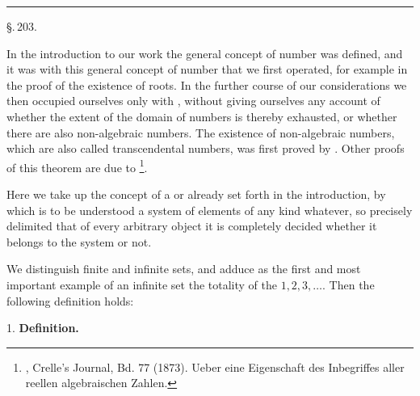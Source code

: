 
\begin{center}

\end{center}

\begin{center}
\rule{4cm}{0.4pt}
\end{center}

\begin{center}
\S.\,203.

\end{center}

In the introduction to our work the general concept of number was defined, and it was with this general concept of number that we first operated, for example in the proof of the existence of roots. In the further course of our considerations we then occupied ourselves only with , without giving ourselves any account of whether the extent of the domain of numbers is thereby exhausted, or whether there are also non-algebraic numbers. The existence of non-algebraic numbers, which are also called transcendental numbers, was first proved by . Other proofs of this theorem are due to \footnote{, Crelle's Journal, Bd. 77 (1873). Ueber eine Eigenschaft des Inbegriffes aller reellen algebraischen Zahlen.}.

Here we take up the concept of a  or  already set forth in the introduction, by which is to be understood a system of elements of any kind whatever, so precisely delimited that of every arbitrary object it is completely decided whether it belongs to the system or not.

We distinguish finite and infinite sets, and adduce as the first and most important example of an infinite set the totality of the  $1, 2, 3, \ldots$. Then the following definition holds:

1. \textbf{Definition.} 
